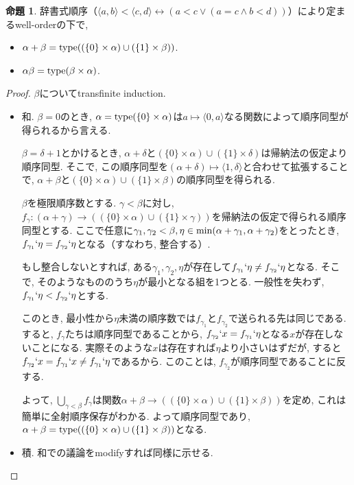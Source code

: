 \documentclass[a4paper, twoside]{bxjsarticle}
\theoremstyle{definition}
\newtheorem{prop}[thm]{命題}
\begin{document}
        \begin{prop}
            辞書式順序（$\langle a, b\rangle < \langle c, d\rangle \leftrightarrow (a<c\lor (a=c\land b<d))$）により定まるwell-orderの下で,
            
            \begin{itemize}
                \item $\alpha+\beta = {\rm type}((\{0\}\times\alpha)\cup(\{1\}\times\beta))$.
                \item $\alpha\beta = {\rm type}(\beta\times\alpha)$.
            \end{itemize}
        \end{prop}
        \begin{proof}
            $\beta$についてtransfinite induction. 
            
            \begin{itemize}
                \item 和. $\beta=0$のとき, $\alpha={\rm type}(\{0\}\times\alpha)$は$a \mapsto \langle 0, a\rangle$なる関数によって順序同型が得られるから言える. 
                
                $\beta = \delta+1$とかけるとき, $\alpha+\delta$と$(\{0\}\times\alpha)\cup(\{1\}\times\delta)$は帰納法の仮定より順序同型. そこで, この順序同型を$(\alpha+\delta)\mapsto\langle 1, \delta\rangle$と合わせて拡張することで, $\alpha+\beta$と$(\{0\}\times\alpha)\cup(\{1\}\times\beta)$の順序同型を得られる.
                
                $\beta$を極限順序数とする.  $\gamma<\beta$に対し, $f_\gamma\colon(\alpha+\gamma)\to((\{0\}\times\alpha)\cup(\{1\}\times\gamma))$を帰納法の仮定で得られる順序同型とする. ここで任意に$\gamma_1, \gamma_2<\beta, \eta\in{\rm min}(\alpha+\gamma_1, \alpha+\gamma_2)$をとったとき, $f_{\gamma_1}`\eta=f_{\gamma_2}`\eta$となる（すなわち, 整合する）.
                \begin{framed}
                    もし整合しないとすれば, ある$\gamma_1, \gamma_2, \eta$が存在して$f_{\gamma_1}`\eta\neq f_{\gamma_2}`\eta$となる. そこで, そのようなもののうち$\eta$が最小となる組を1つとる. 一般性を失わず,　$f_{\gamma_1}`\eta<f_{\gamma_2}`\eta$とする.
                    
                    このとき, 最小性から$\eta$未満の順序数では$f_{\gamma_1}$と$f_{\gamma_2}$で送られる先は同じである. すると, $f_\gamma$たちは順序同型であることから, $f_{\gamma_2}`x = f_{\gamma_1}`\eta$となる$x$が存在しないことになる. 実際そのような$x$は存在すれば$\eta$より小さいはずだが, すると$f_{\gamma_2}`x=f_{\gamma_1}`x \neq f_{\gamma_1}`\eta$であるから. このことは, $f_{\gamma_2}$が順序同型であることに反する.
                \end{framed}
                よって, $\bigcup_{\gamma<\beta}f_\gamma$は関数$\alpha+\beta\to((\{0\}\times\alpha)\cup(\{1\}\times\beta))$を定め, これは簡単に全射順序保存がわかる. よって順序同型であり, $\alpha+\beta = {\rm type}((\{0\}\times\alpha)\cup(\{1\}\times\beta))$となる.
                
                \item 積. 和での議論をmodifyすれば同様に示せる.
            \end{itemize}
        \end{proof}
\end{document}
